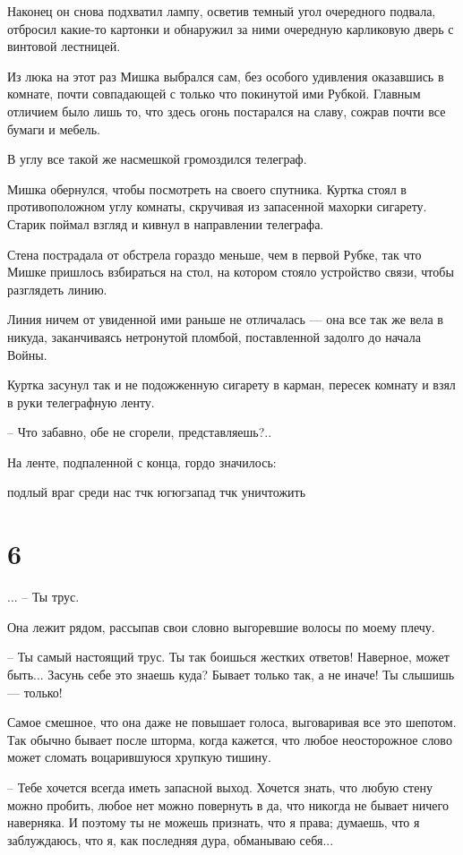 \documentclass[a5paper]{article}
\begin{document}
Наконец он снова подхватил лампу, осветив темный угол очередного подвала, отбросил какие-то картонки и обнаружил за ними очередную карликовую дверь с винтовой лестницей.

Из люка на этот раз Мишка выбрался сам, без особого удивления оказавшись в комнате, почти совпадающей с только что покинутой ими Рубкой. Главным отличием было лишь то, что здесь огонь постарался на славу, сожрав почти все бумаги и мебель.

В углу все такой же насмешкой громоздился телеграф.

Мишка обернулся, чтобы посмотреть на своего спутника. Куртка стоял в противоположном углу комнаты, скручивая из запасенной махорки сигарету. Старик поймал взгляд и кивнул в направлении телеграфа.

Стена пострадала от обстрела гораздо меньше, чем в первой Рубке, так что Мишке пришлось взбираться на стол, на котором стояло устройство связи, чтобы разглядеть линию.

Линия ничем от увиденной ими раньше не отличалась --- она все так же вела в никуда, заканчиваясь нетронутой пломбой, поставленной задолго до начала Войны.

Куртка засунул так и не подожженную сигарету в карман, пересек комнату и взял в руки телеграфную ленту.

-- Что забавно, обе не сгорели, представляешь?..

На ленте, подпаленной с конца, гордо значилось:

подлый враг среди нас тчк югюгзапад тчк уничтожить

\section*{6}

... -- Ты трус.

Она лежит рядом, рассыпав свои словно выгоревшие волосы по моему плечу.

-- Ты самый настоящий трус. Ты так боишься жестких ответов! Наверное, может быть... Засунь себе это знаешь куда? Бывает только так, а не иначе! Ты слышишь --- только!

Самое смешное, что она даже не повышает голоса, выговаривая все это шепотом. Так обычно бывает после шторма, когда кажется, что любое неосторожное слово может сломать воцарившуюся хрупкую тишину.

-- Тебе хочется всегда иметь запасной выход. Хочется знать, что любую стену можно пробить, любое нет можно повернуть в да, что никогда не бывает ничего наверняка. И поэтому ты не можешь признать, что я права; думаешь, что я заблуждаюсь, что я, как последняя дура, обманываю себя...
\end{document}
